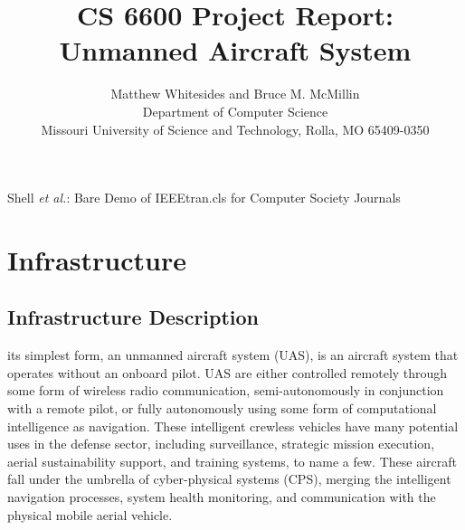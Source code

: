 \documentclass[10pt,journal,compsoc]{IEEEtran}
\begin{document}
\title{CS 6600 Project Report: Unmanned Aircraft System}

\author{Matthew Whitesides and Bruce M. McMillin \\
Department of Computer Science \\
Missouri University of Science and Technology, Rolla, MO 65409-0350} 

%
{Shell \MakeLowercase{\textit{et al.}}: Bare Demo of IEEEtran.cls for Computer Society Journals}
 

\maketitle

\IEEEpeerreviewmaketitle


\section{Infrastructure}

\subsection{Infrastructure Description}

 its simplest form, an unmanned aircraft system (UAS), is an aircraft system that operates without an onboard pilot. 
UAS are either controlled remotely through some form of wireless radio communication, semi-autonomously in conjunction with a remote pilot, or fully autonomously using some form of computational intelligence as navigation. 
These intelligent crewless vehicles have many potential uses in the defense sector, including surveillance, strategic mission execution, aerial sustainability support, and training systems, to name a few. 
These aircraft fall under the umbrella of cyber-physical systems (CPS), merging the intelligent navigation processes, system health monitoring, and communication with the physical mobile aerial vehicle.
\end{document}
